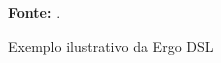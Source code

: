 \begin{figure}[ht!]
\centering

\caption{\textmd{Exemplo ilustrativo da Ergo DSL}}
\label{fig:ergotexto}

\par\medskip\textbf{Fonte:} \cite{accordproject}. \par\medskip

\end{figure}

